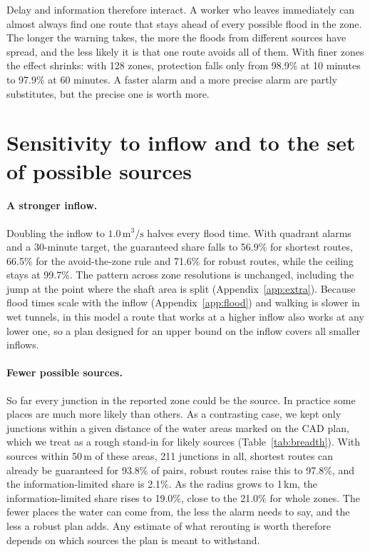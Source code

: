 \documentclass[11pt,a4paper]{article}
\begin{document}
Delay and information therefore interact. A worker who leaves immediately can almost always find one route that stays ahead of every possible flood in the zone. The longer the warning takes, the more the floods from different sources have spread, and the less likely it is that one route avoids all of them. With finer zones the effect shrinks: with 128 zones, protection falls only from 98.9\% at 10 minutes to 97.9\% at 60 minutes. A faster alarm and a more precise alarm are partly substitutes, but the precise one is worth more.

\section{Sensitivity to inflow and to the set of possible sources}\label{sec:robust}
\paragraph{A stronger inflow.}
Doubling the inflow to $1.0\,\mathrm{m^3/s}$ halves every flood time. With quadrant alarms and a 30-minute target, the guaranteed share falls to 56.9\% for shortest routes, 66.5\% for the avoid-the-zone rule and 71.6\% for robust routes, while the ceiling stays at 99.7\%. The pattern across zone resolutions is unchanged, including the jump at the point where the shaft area is split (Appendix~\ref{app:extra}). Because flood times scale with the inflow (Appendix~\ref{app:flood}) and walking is slower in wet tunnels, in this model a route that works at a higher inflow also works at any lower one, so a plan designed for an upper bound on the inflow covers all smaller inflows.

\paragraph{Fewer possible sources.}
So far every junction in the reported zone could be the source. In practice some places are much more likely than others. As a contrasting case, we kept only junctions within a given distance of the water areas marked on the CAD plan, which we treat as a rough stand-in for likely sources (Table~\ref{tab:breadth}). With sources within 50\,m of these areas, 211 junctions in all, shortest routes can already be guaranteed for 93.8\% of pairs, robust routes raise this to 97.8\%, and the information-limited share is 2.1\%. As the radius grows to 1\,km, the information-limited share rises to 19.0\%, close to the 21.0\% for whole zones. The fewer places the water can come from, the less the alarm needs to say, and the less a robust plan adds. Any estimate of what rerouting is worth therefore depends on which sources the plan is meant to withstand.
\end{document}
